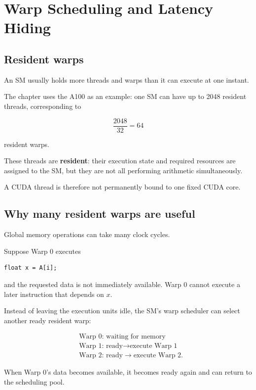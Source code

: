 \documentclass[11pt,a4paper]{article}
\begin{document}
\section{Warp Scheduling and Latency Hiding}

\subsection{Resident warps}

An SM usually holds more threads and warps than it can execute at one instant.

The chapter uses the A100 as an example: one SM can have up to 2048 resident threads, corresponding to

\[
\frac{2048}{32}=64
\]

resident warps.

These threads are \textbf{resident}: their execution state and required resources are assigned to the SM, but they are not all performing arithmetic simultaneously.

A CUDA thread is therefore not permanently bound to one fixed CUDA core.

\subsection{Why many resident warps are useful}

Global memory operations can take many clock cycles.

Suppose Warp 0 executes

\begin{lstlisting}
float x = A[i];
\end{lstlisting}

and the requested data is not immediately available. Warp 0 cannot execute a later instruction that depends on \(x\).

Instead of leaving the execution units idle, the SM's warp scheduler can select another ready resident warp:

\[
\begin{aligned}
&\text{Warp 0: waiting for memory}\\
&\text{Warp 1: ready}
\rightarrow
\text{execute Warp 1}\\
&\text{Warp 2: ready}
\rightarrow
\text{execute Warp 2}.
\end{aligned}
\]

When Warp 0's data becomes available, it becomes ready again and can return to the scheduling pool.
\end{document}
